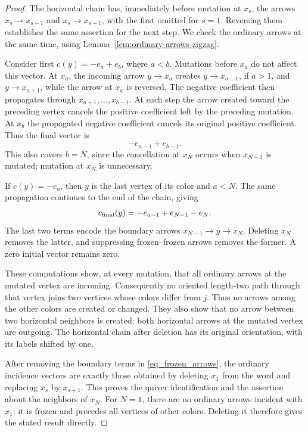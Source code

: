 \documentclass[12pt, reqno]{amsart}
\theoremstyle{plain}
\theoremstyle{definition}
\numberwithin{equation}{section}
\begin{document}
\begin{proof}
The horizontal chain has, immediately before mutation at \(x_s\),
the arrows \(x_s\to x_{s-1}\) and \(x_s\to x_{s+1}\), with the
first omitted for \(s=1\). Reversing them establishes the same
assertion for the next step. We check the ordinary arrows at the
same time, using Lemma~\ref{lem:ordinary-arrows-zigzag}.

Consider first \(c(y)=-e_a+e_b\), where \(a<b\). Mutations before
\(x_a\) do not affect this vector. At \(x_a\), the incoming arrow
\(y\to x_a\) creates \(y\to x_{a-1}\), if \(a>1\), and
\(y\to x_{a+1}\), while the arrow at \(x_a\) is reversed. The
negative coefficient then propagates through \(x_{a+1},\ldots,x_{b-1}\).
At each step the arrow created toward the preceding vertex cancels
the positive coefficient left by the preceding mutation. At \(x_b\)
the propagated negative coefficient cancels its original positive
coefficient. Thus the final vector is
\[
 -e_{a-1}+e_{b-1}.
\]
This also covers \(b=N\), since the cancellation at \(x_N\) occurs
when \(x_{N-1}\) is mutated; mutation at \(x_N\) is unnecessary.

If \(c(y)=-e_a\), then \(y\) is the last vertex of its color and
\(a<N\). The same propagation continues to the end of the chain,
giving
\begin{equation}\label{eq_frozen_arrows}
 c_{\rm final}(y)=-e_{a-1}+e_{N-1}-e_N.
\end{equation}
The last two terms encode the boundary arrows
\(x_{N-1}\to y\to x_N\). Deleting \(x_N\) removes the latter,
and suppressing frozen--frozen arrows removes the former.
A zero initial vector remains zero.

These computations show, at every mutation, that all ordinary
arrows at the mutated vertex are incoming. Consequently no oriented
length-two path through that vertex joins two vertices whose colors
differ from \(j\). Thus no arrows among the other colors are created
or changed. They also show that no arrow between two horizontal
neighbors is created: both horizontal arrows at the mutated vertex
are outgoing. The horizontal chain after deletion has its original
orientation, with its labels shifted by one.

After removing the boundary terms in \eqref{eq_frozen_arrows}, the
ordinary incidence vectors are exactly those obtained by deleting
\(x_1\) from the word and replacing \(x_s\) by \(x_{s+1}\). This
proves the quiver identification and the assertion about the neighbors
of \(x_N\). For \(N=1\), there are no ordinary arrows incident with
\(x_1\): it is frozen and precedes all vertices of other colors.
Deleting it therefore gives the stated result directly.
\end{proof}
\end{document}
